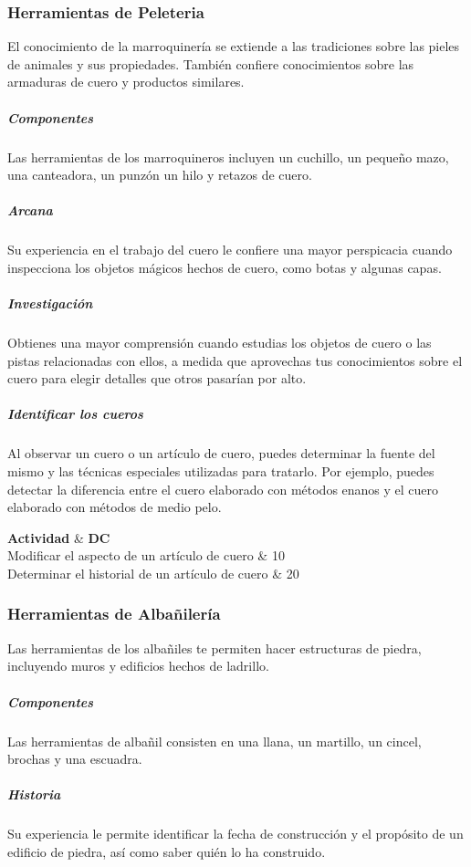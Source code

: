 \documentclass[a4paper,twocolumn,openany,10pt]{dndbook}
\begin{document}
\subsubsection*{Herramientas de Peleteria}
El conocimiento de la marroquinería se extiende a las tradiciones sobre las pieles de animales y sus propiedades. También
confiere conocimientos sobre las armaduras de cuero y productos similares.

\subparagraph{Componentes} Las herramientas de los marroquineros incluyen un cuchillo, un pequeño mazo, una canteadora, un punzón
un hilo y retazos de cuero.

\subparagraph{Arcana} Su experiencia en el trabajo del cuero le confiere una mayor perspicacia cuando inspecciona los objetos
mágicos hechos de cuero, como botas y algunas capas.

\subparagraph{Investigación} Obtienes una mayor comprensión cuando estudias los objetos de cuero o las pistas relacionadas con
ellos, a medida que aprovechas tus conocimientos sobre el cuero para elegir detalles que otros pasarían por alto.

\subparagraph{Identificar los cueros} Al observar un cuero o un artículo de cuero, puedes determinar la fuente del mismo y las
técnicas especiales utilizadas para tratarlo. Por ejemplo, puedes detectar la diferencia entre el cuero elaborado con métodos
enanos y el cuero elaborado con métodos de medio pelo. 

\begin{dndtable}[Xc]
	\textbf{Actividad}									& \textbf{DC}	\\
	Modificar el aspecto de un artículo de cuero		& 10	\\
	Determinar el historial de un artículo de cuero		& 20	\\
\end{dndtable}

\subsubsection*{Herramientas de Albañilería}
Las herramientas de los albañiles te permiten hacer estructuras de piedra, incluyendo muros y edificios hechos de ladrillo.

\subparagraph{Componentes} Las herramientas de albañil consisten en una llana, un martillo, un cincel, brochas y una escuadra. 

\subparagraph{Historia} Su experiencia le permite identificar la fecha de construcción y el propósito de un edificio de piedra,
así como saber quién lo ha construido. 
\end{document}
